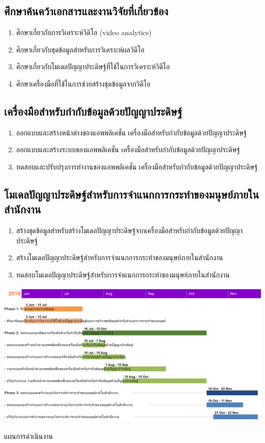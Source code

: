 \subsection*{ศึกษาค้นคว้าเอกสารและงานวิจัยที่เกี่ยวข้อง}
\begin{enumerate}\setlength\itemsep{-0.25em}
	\item ศึกษาเกี่ยวกับการวิเคราะห์วิดิโอ (video analytics)
	\item ศึกษาเกี่ยวกับชุดข้อมูลสำหรับการวิเคราะห์ผลวิดีโอ
	\item ศึกษาเกี่ยวกับโมเดลปัญญาประดิษฐ์ที่ใช้ในการวิเคราะห์วิดีโอ
	\item ศึกษาเครื่องมือที่ใช้ในการช่วยสร้างชุดข้อมูลจากวิดีโอ
\end{enumerate}
\subsection*{เครื่องมือสำหรับกำกับข้อมูลด้วยปัญญาประดิษฐ์}
\begin{enumerate}\setlength\itemsep{-0.25em}
	\item ออกแบบและสร้างหน้าต่างของแอพพลิเคชั่น เครื่องมือสำหรับกำกับข้อมูลด้วยปัญญาประดิษฐ์
	\item ออกแบบและสร้างระบบของแอพพลิเคชั่น เครื่องมือสำหรับกำกับข้อมูลด้วยปัญญาประดิษฐ์
	\item ทดสอบและปรับปรุงการทำงานของแอพพลิเคชั่น เครื่องมือสำหรับกำกับข้อมูลด้วยปัญญาประดิษฐ์
\end{enumerate}
\subsection*{โมเดลปัญญาประดิษฐ์สำหรับการจำแนกการกระทำของมนุษย์ภายในสำนักงาน}
\begin{enumerate}\setlength\itemsep{-0.25em}
	\item สร้างชุดข้อมูลสำหรับสร้างโมเดลปัญญาประดิษฐ์จากเครื่องมือสำหรับกำกับข้อมูลด้วยปัญญาประดิษฐ์
	\item สร้างโมเดลปัญญาประดิษฐ์สำหรับการจำแนกการกระทำของมนุษย์ภายในสำนักงาน
	\item ทดสอบโมเดลปัญญาประดิษฐ์สำหรับการจำแนกการกระทำของมนุษย์ภายในสำนักงาน
\end{enumerate}
\clearpage

\begin{table}[!ht]
	\includegraphics[width=1.125\textwidth]{chapter1/ganttchart.png}
	\caption{แผนการดำเนินงาน}
	\label{tab:ganttchart}
\end{table}
\clearpage